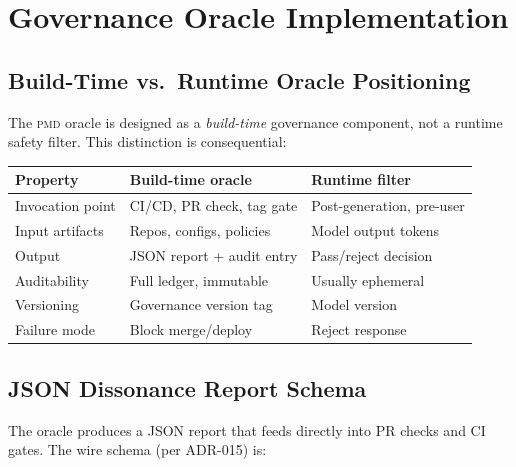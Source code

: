 \documentclass[11pt,letterpaper]{article}
\theoremstyle{remark}
\newcommand{\pmd}{\textsc{pmd}}
\begin{document}
\section{Governance Oracle Implementation}
\label{sec:impl}

\subsection{Build-Time vs.\ Runtime Oracle Positioning}

The \pmd{} oracle is designed as a \emph{build-time} governance component,
not a runtime safety filter.  This distinction is consequential:

\begin{center}
\begin{tabular}{lll}
\toprule
\textbf{Property} & \textbf{Build-time oracle} & \textbf{Runtime filter} \\
\midrule
Invocation point  & CI/CD, PR check, tag gate & Post-generation, pre-user \\
Input artifacts   & Repos, configs, policies   & Model output tokens \\
Output            & JSON report + audit entry  & Pass/reject decision \\
Auditability      & Full ledger, immutable     & Usually ephemeral \\
Versioning        & Governance version tag     & Model version \\
Failure mode      & Block merge/deploy         & Reject response \\
\bottomrule
\end{tabular}
\end{center}

\subsection{JSON Dissonance Report Schema}

The oracle produces a JSON report that feeds directly into PR checks
and CI gates.  The wire schema (per ADR-015) is:
\end{document}
